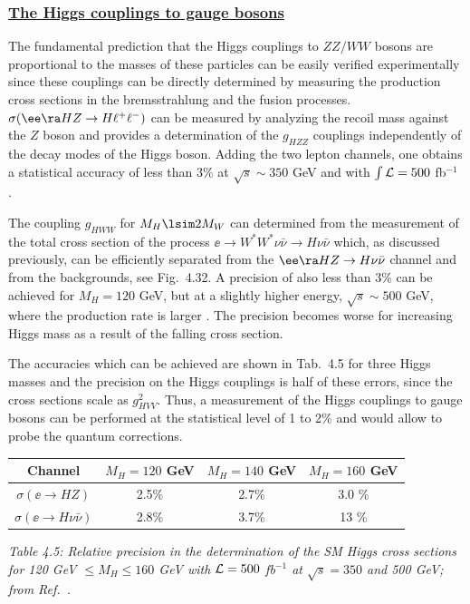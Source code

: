 \newpage 
\subsubsection*{\underline{The Higgs couplings to gauge bosons}}
\vspace*{-1mm}

The fundamental prediction that the Higgs couplings to $ZZ/WW$ bosons are
proportional to the masses of these particles can be easily verified 
experimentally since  these couplings can be directly determined by measuring 
the production cross sections in the bremsstrahlung and the fusion processes.  
$\sigma(\ee \ra HZ \to H \ell^+ \ell^-)$ can be measured by analyzing the recoil
mass against the $Z$ boson and provides a determination of the $g_{HZZ}$ 
couplings independently of the decay modes of the Higgs boson. Adding the
two lepton channels, one obtains a statistical accuracy of less than 3\%
at $\sqrt{s}\sim 350$ GeV and with $\int {\cal L}=500$ fb$^{-1}$ 
\cite{meas-mass1}. \s
       
The coupling $g_{HWW}$ for $M_H\lsim 2M_W$ can determined from the measurement
of the total cross section of the process $\ee \to W^* W^* \nu \bar \nu \to
H\nu \bar{\nu}$ which, as discussed previously, can be efficiently separated
from the $\ee \ra HZ \to H \nu \bar \nu$ channel and from the backgrounds, see
Fig.~4.32.  A precision of also less than 3\% can be achieved for $M_H=120$
GeV, but at a slightly higher energy, $\sqrt{s}\sim 500$ GeV, where the
production rate is larger \cite{meas-HWW}. The precision becomes worse for
increasing Higgs mass as a result of the falling cross section.\s

The accuracies which can be achieved are shown in Tab.~4.5 for three Higgs 
masses
and the precision on the Higgs couplings is half of these errors, since the
cross sections scale as $g_{HVV}^2$. Thus, a measurement of the Higgs couplings
to gauge bosons can be performed at the statistical level of 1 to 2\% and would
allow to probe the quantum corrections.  

\begin{table}[hbt]
\renewcommand{\arraystretch}{1.2}
\begin{center}
\begin{tabular}{|c|c|c|c|}
\hline
Channel & $M_H=120$ GeV & $M_H=140$ GeV & $M_H=160$ GeV \\ \hline
$\sigma (\ee \to HZ)$       & 2.5\% & 2.7\% & 3.0 \%  \\ 
$\sigma(\ee \to H \nu \bar \nu)$ & 2.8\% & 3.7\% & 13 \%  \\ \hline 
\end{tabular}
\end{center}
\vspace{.1cm}
{\it Table 4.5: Relative precision in the determination of the SM Higgs cross 
sections for 120 GeV $\leq M_H \leq 160$ GeV with ${\cal L}=500$ fb$^{-1}$ 
at $\sqrt{s} = 350$ and 500 GeV; from Ref.~\cite{TESLA}.}
\vspace{-.5cm}
\end{table}


